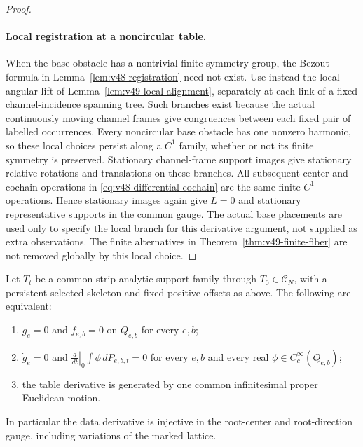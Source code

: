 \begin{proof}
\paragraph{Local registration at a noncircular table.}
When the base obstacle has a nontrivial finite symmetry group, the
Bezout formula in Lemma~\ref{lem:v48-registration} need not exist.
Use instead the local angular lift of
Lemma~\ref{lem:v49-local-alignment}, separately at each link of a fixed
channel-incidence spanning tree.  Such branches exist because the actual
continuously moving channel frames give congruences between each fixed
pair of labelled occurrences.  Every noncircular base obstacle has
one nonzero harmonic, so these local choices persist along a
$C^1$ family, whether or not its finite symmetry is preserved.
Stationary channel-frame support images give stationary relative
rotations and translations on these branches.  All subsequent center
and cochain operations in \eqref{eq:v48-differential-cochain} are the
same finite $C^1$ operations.  Hence stationary images again give
$\dot L=0$ and stationary representative supports in the common gauge.
The actual base placements are used only to specify the local branch
for this derivative argument, not supplied as extra observations.
The finite alternatives in Theorem~\ref{thm:v49-finite-fiber} are not
removed globally by this local choice.
\end{proof}

\begin{theorem}
\label{thm:v48-infinitesimal}
Let $T_t$ be a common-strip analytic-support family through
$T_0\in\mathscr C_N$, with a persistent selected skeleton and fixed
positive offsets as above.  The following are equivalent:
\begin{enumerate}
\item $\dot g_e=0$ and $\dot f_{e,b}=0$ on $Q_{e,b}$ for every $e,b$;
\item $\dot g_e=0$ and $\left.\frac{d}{dt}\right|_0
\int\phi\,dP_{e,b,t}=0$ for every $e,b$ and every real
$\phi\in C_c^\infty(Q_{e,b})$;
\item the table derivative is generated by one common infinitesimal
proper Euclidean motion.
\end{enumerate}
In particular the data derivative is injective in the root-center and
root-direction gauge, including variations of the marked lattice.
\end{theorem}

